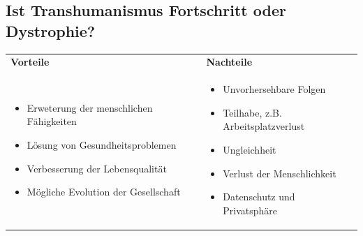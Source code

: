\documentclass[aspectratio=169,16pt,xcolor=table]{beamer}
\begin{document}
\subsection{Ist Transhumanismus Fortschritt oder Dystrophie?}
  \begin{frame} %
    \begin{center}
    


\begin{tabular}{|p{6.5cm}|@{}p{1cm}@{}|p{6.5cm}|}
    \hline
    \cellcolor{green!40}\textbf{Vorteile} & \textbf{} & \cellcolor{red!50}\textbf{Nachteile} \\
            \small
            \begin{itemize}
                \item Erweterung der menschlichen Fähigkeiten
                \item Lösung von Gesundheitsproblemen
                \item Verbesserung der Lebensqualität
                \item Mögliche Evolution der Gesellschaft
            \end{itemize}
            & & 
            \begin{itemize}
                \item Unvorhersehbare Folgen
                \item Teilhabe, z.B. Arbeitsplatzverlust
                \item Ungleichheit
                \item Verlust der Menschlichkeit
                \item Datenschutz und Privatsphäre
            \end{itemize} \\
        \hline
    \end{tabular}

    \end{center}
\end{frame}

\printbibliography %
\end{document}
